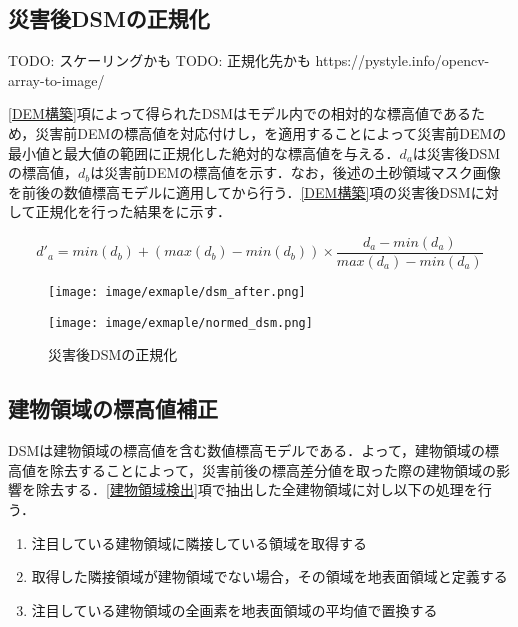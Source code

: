     \subsection{災害後DSMの正規化}
      \label{災害後DSMの正規化}
      TODO: スケーリングかも
      TODO: 正規化先かも
      https://pystyle.info/opencv-array-to-image/

      \ref{DEM構築}項によって得られたDSMはモデル内での相対的な標高値であるため，災害前DEMの標高値を対応付けし，を適用することによって災害前DEMの最小値と最大値の範囲に正規化した絶対的な標高値を与える．$d_{a}$は災害後DSMの標高値，$d_{b}$は災害前DEMの標高値を示す．なお，後述の土砂領域マスク画像を前後の数値標高モデルに適用してから行う．\ref{DEM構築}項の災害後DSMに対して正規化を行った結果をに示す．

      \begin{equation}
        \label{正規化}
        d'_{a} =  
          min(d_{b}) + (max(d_{b}) - min(d_{b})) \times
          \dfrac{d_{a} - min(d_{a})} {max(d_{a}) - min(d_{a})}
      \end{equation}

      \begin{figure}[tbp]
        \begin{minipage}[c]{0.5\hsize}
          \centering
          \texttt{[image: image/exmaple/dsm\_after.png]}
        \end{minipage}
        \begin{minipage}[c]{0.5\hsize}
          \centering
          \texttt{[image: image/exmaple/normed\_dsm.png]}
        \end{minipage}
        \caption{災害後DSMの正規化}
        \label{災害後DSMの正規化結果}
      \end{figure}


    \subsection{建物領域の標高値補正}
      DSMは建物領域の標高値を含む数値標高モデルである．よって，建物領域の標高値を除去することによって，災害前後の標高差分値を取った際の建物領域の影響を除去する．\ref{建物領域検出}項で抽出した全建物領域に対し以下の処理を行う．

      \begin{enumerate}
        \setlength{\itemsep}{-5pt}
        \item 注目している建物領域に隣接している領域を取得する
        \item 取得した隣接領域が建物領域でない場合，その領域を地表面領域と定義する
        \item 注目している建物領域の全画素を地表面領域の平均値で置換する
      \end{enumerate}

